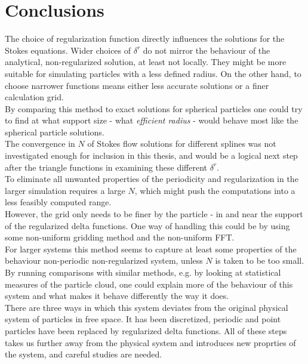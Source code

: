 \documentclass[a4paper,
twoside=false,abstract=false,numbers=noenddot,
titlepage=false,headings=small,parskip=half,version=last]{scrartcl}
\begin{document}
\section{Conclusions}
The choice of regularization function directly influences the solutions for the Stokes equations.
Wider choices of $\delta^r$ do not mirror the behaviour of the analytical, non-regularized solution, at least not locally.
They might be more suitable for simulating particles with a less defined radius.
On the other hand, to choose narrower functions means either less accurate solutions or a finer calculation grid.\\
By comparing this method to exact solutions for spherical particles one could try to find at what support size - what \emph{efficient radius} - would behave most like the spherical particle solutions.\\
The convergence in $N$ of Stokes flow solutions for different splines was not investigated enough for inclusion in this thesis, and would be a logical next step after the triangle functions in examining these different $\delta^r$.\\
To eliminate all unwanted properties of the periodicity and regularization in the larger simulation requires a large $N$, which might push the computations into a less feasibly computed range.\\
However, the grid only needs to be finer by the particle - in and near the support of the regularized delta functions.
One way of handling this could be by using some non-uniform gridding method and the non-uniform FFT.\\
For larger systems this method seems to capture at least some properties of the behaviour non-periodic non-regularized system, unless $N$ is taken to be too small. By running comparisons with similar methods, e.g. by looking at statistical measures of the particle cloud, one could explain more of the behaviour of this system and what makes it behave differently the way it does.\\
There are three ways in which this system deviates from the original physical system of particles in free space. It has been discretized, periodic and point particles have been replaced by regularized delta functions. All of these steps takes us further away from the physical system and introduces new proprties of the system, and careful studies are needed.



\end{document}
